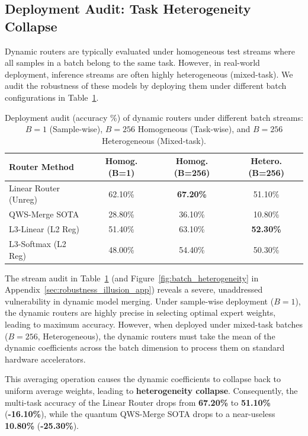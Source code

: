 \subsection{Deployment Audit: Task Heterogeneity Collapse}
Dynamic routers are typically evaluated under homogeneous test streams where all samples in a batch belong to the same task. However, in real-world deployment, inference streams are often highly heterogeneous (mixed-task). We audit the robustness of these models by deploying them under different batch configurations in Table~\ref{tab:hetero_results}.

\begin{table}[h]
\centering
\caption{Deployment audit (accuracy \%) of dynamic routers under different batch streams: $B=1$ (Sample-wise), $B=256$ Homogeneous (Task-wise), and $B=256$ Heterogeneous (Mixed-task).}
\label{tab:hetero_results}
\begin{tabular}{lccc}
\toprule
\textbf{Router Method} & \textbf{Homog. (B=1)} & \textbf{Homog. (B=256)} & \textbf{Hetero. (B=256)} \\
\midrule
Linear Router (Unreg) & 62.10\% & \textbf{67.20\%} & 51.10\% \\
QWS-Merge SOTA & 28.80\% & 36.10\% & 10.80\% \\
L3-Linear (L2 Reg) & 51.40\% & 63.10\% & \textbf{52.30\%} \\
L3-Softmax (L2 Reg) & 48.00\% & 54.40\% & 50.30\% \\
\bottomrule
\end{tabular}
\end{table}

The stream audit in Table~\ref{tab:hetero_results} (and Figure~\ref{fig:batch_heterogeneity} in Appendix~\ref{sec:robustness_illusion_app}) reveals a severe, unaddressed vulnerability in dynamic model merging. Under sample-wise deployment ($B=1$), the dynamic routers are highly precise in selecting optimal expert weights, leading to maximum accuracy. However, when deployed under mixed-task batches ($B=256$, Heterogeneous), the dynamic routers must take the mean of the dynamic coefficients across the batch dimension to process them on standard hardware accelerators. 

This averaging operation causes the dynamic coefficients to collapse back to uniform average weights, leading to \textbf{heterogeneity collapse}. Consequently, the multi-task accuracy of the Linear Router drops from \textbf{67.20\%} to \textbf{51.10\%} (\textbf{-16.10\%}), while the quantum QWS-Merge SOTA drops to a near-useless \textbf{10.80\%} (\textbf{-25.30\%}).

